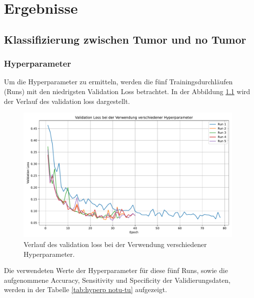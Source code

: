 \chapter{Ergebnisse}

\section{Klassifizierung zwischen Tumor und no Tumor}

\subsection{Hyperparameter}
Um die Hyperparameter zu ermitteln, werden die fünf Trainingsdurchläufen (Runs) mit den niedrigsten Validation Loss betrachtet.
In der Abbildung \ref{fig:val_loss notu-tu} wird der Verlauf des validation loss dargestellt.
\begin{figure}[H]
  \centering
  \includegraphics[scale=0.4]{plots/Val_loss_noTu_Tu.pdf}
  \caption{Verlauf des validation loss bei der Verwendung verschiedener Hyperparameter.}
  \label{fig:val_loss notu-tu}
\end{figure}
\vspace{-2em}
Die verwendeten Werte der Hyperparameter für diese fünf Runs, sowie die aufgenommene Accuracy, Sensitivity und Specificity der Validierungsdaten,
werden in der Tabelle \ref{tab:hyperp notu-tu} aufgezeigt.
